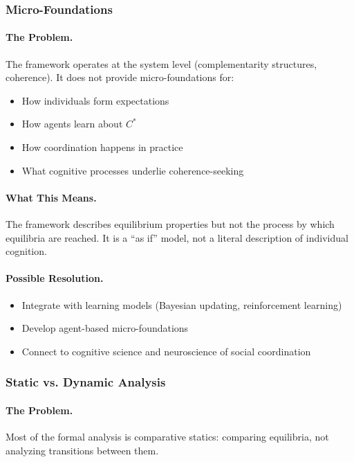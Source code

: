 \subsubsection{Micro-Foundations}

\paragraph{The Problem.}
The framework operates at the system level (complementarity structures, coherence).
It does not provide micro-foundations for:
\begin{itemize}
  \item How individuals form expectations
  \item How agents learn about $C^*$
  \item How coordination happens in practice
  \item What cognitive processes underlie coherence-seeking
\end{itemize}

\paragraph{What This Means.}
The framework describes equilibrium properties but not the process
by which equilibria are reached. It is a ``as if'' model, not a
literal description of individual cognition.

\paragraph{Possible Resolution.}
\begin{itemize}
  \item Integrate with learning models (Bayesian updating, reinforcement learning)
  \item Develop agent-based micro-foundations
  \item Connect to cognitive science and neuroscience of social coordination
\end{itemize}

\subsubsection{Static vs. Dynamic Analysis}

\paragraph{The Problem.}
Most of the formal analysis is comparative statics:
comparing equilibria, not analyzing transitions between them.

